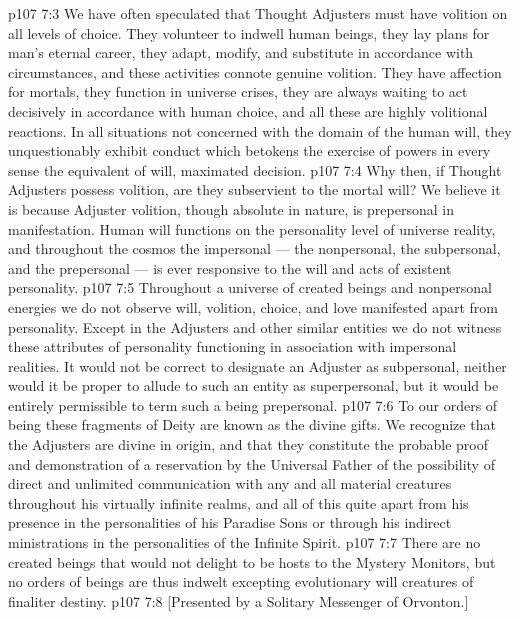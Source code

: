 \vs p107 7:3 We have often speculated that Thought Adjusters must have volition on all  levels of choice. They volunteer to indwell human beings, they lay plans for man’s eternal career, they adapt, modify, and substitute in accordance with circumstances, and these activities connote genuine volition. They have affection for mortals, they function in universe crises, they are always waiting to act decisively in accordance with human choice, and all these are highly volitional reactions. In all situations not concerned with the domain of the human will, they unquestionably exhibit conduct which betokens the exercise of powers in every sense the equivalent of will, maximated decision.
\vs p107 7:4 Why then, if Thought Adjusters possess volition, are they subservient to the mortal will? We believe it is because Adjuster volition, though absolute in nature, is prepersonal in manifestation. Human will functions on the personality level of universe reality, and throughout the cosmos the impersonal --- the nonpersonal, the subpersonal, and the prepersonal --- is ever responsive to the will and acts of existent personality.
\vs p107 7:5 Throughout a universe of created beings and nonpersonal energies we do not observe will, volition, choice, and love manifested apart from personality. Except in the Adjusters and other similar entities we do not witness these attributes of personality functioning in association with impersonal realities. It would not be correct to designate an Adjuster as subpersonal, neither would it be proper to allude to such an entity as superpersonal, but it would be entirely permissible to term such a being prepersonal.
\vs p107 7:6 \pc To our orders of being these fragments of Deity are known as the divine gifts. We recognize that the Adjusters are divine in origin, and that they constitute the probable proof and demonstration of a reservation by the Universal Father of the possibility of direct and unlimited communication with any and all material creatures throughout his virtually infinite realms, and all of this quite apart from his presence in the personalities of his Paradise Sons or through his indirect ministrations in the personalities of the Infinite Spirit.
\vs p107 7:7 There are no created beings that would not delight to be hosts to the Mystery Monitors, but no orders of beings are thus indwelt excepting evolutionary will creatures of finaliter destiny.
\vsetoff
\vs p107 7:8 [Presented by a Solitary Messenger of Orvonton.]
\quizlink
